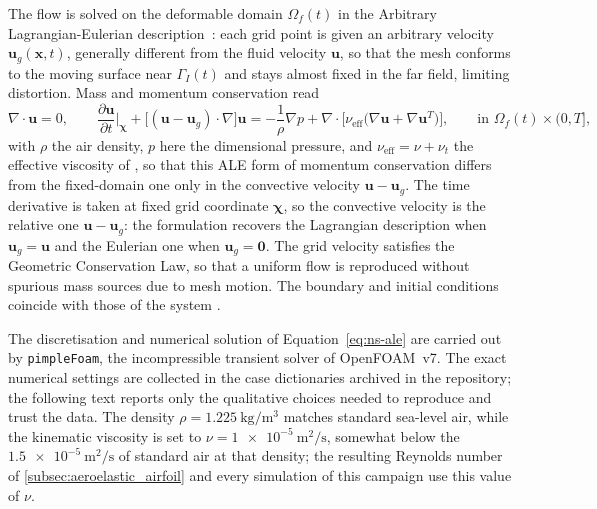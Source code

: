 The flow is solved on the deformable domain $\Omega_f(t)$ in the Arbitrary Lagrangian-Eulerian description~\cite{Donea2004ALE}: each grid point is given an arbitrary velocity $\mathbf{u}_g(\mathbf{x},t)$, generally different from the fluid velocity $\mathbf{u}$, so that the mesh conforms to the moving surface near $\Gamma_I(t)$ and stays almost fixed in the far field, limiting distortion. Mass and momentum conservation read
\begin{equation}
    \nabla \cdot \mathbf{u} = 0,
    \qquad
    \frac{\partial \mathbf{u}}{\partial t}\bigg|_{\boldsymbol\chi}
    + \bigl[(\mathbf{u} - \mathbf{u}_g) \cdot \nabla\bigr]\mathbf{u}
    = -\frac{1}{\rho}\nabla p + \nabla\cdot\bigl[\nu_{\mathrm{eff}}\bigl(\nabla\mathbf u+\nabla\mathbf u^T\bigr)\bigr],
    \qquad \text{in } \Omega_f(t)\times(0,T],
    \label{eq:ns-ale}
\end{equation}
with $\rho$ the air density, $p$ here the dimensional pressure, and $\nu_{\mathrm{eff}}=\nu+\nu_t$ the effective viscosity of , so that this ALE form of momentum conservation differs from the fixed-domain one only in the convective velocity $\mathbf u-\mathbf u_g$. The time derivative is taken at fixed grid coordinate $\boldsymbol\chi$, so the convective velocity is the relative one $\mathbf{u}-\mathbf{u}_g$: the formulation recovers the Lagrangian description when $\mathbf{u}_g=\mathbf{u}$ and the Eulerian one when $\mathbf{u}_g=\mathbf{0}$. The grid velocity satisfies the Geometric Conservation Law, so that a uniform flow is reproduced without spurious mass sources due to mesh motion. The boundary and initial conditions coincide with those of the system .

The discretisation and numerical solution of Equation~\eqref{eq:ns-ale} are carried out by \texttt{pimpleFoam}, the incompressible transient solver of OpenFOAM~v7. The exact numerical settings are collected in the case dictionaries archived in the repository; the following text reports only the qualitative choices needed to reproduce and trust the data. The density $\rho = \SI{1.225}{\kilogram\per\cubic\meter}$ matches standard sea-level air, while the kinematic viscosity is set to $\nu = \SI{1e-5}{\meter\squared\per\second}$, somewhat below the $\SI{1.5e-5}{\meter\squared\per\second}$ of standard air at that density; the resulting Reynolds number of \cref{subsec:aeroelastic_airfoil} and every simulation of this campaign use this value of $\nu$.

